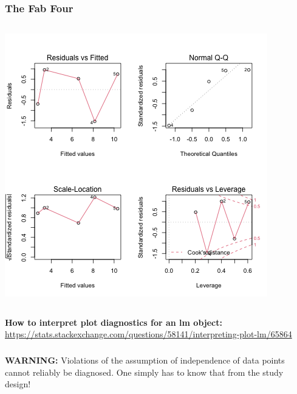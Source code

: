 \documentclass{beamer}
\newenvironment{VerbatimIN}
 {\VerbatimEnvironment
  \begin{tcolorbox}[
    breakable,
    colback=lightgray,
    spartan
  ]%
  \begin{Verbatim}}
 {\end{Verbatim}\end{tcolorbox}}
\begin{document}
\begin{frame}[fragile]
    \frametitle{The Fab Four}
        \begin{columns}
        \begin{column}{0.6\textwidth}
        \includegraphics[width=\textwidth]{lectures/day_2_LM_refresh_I/figures/unnamed-chunk-40-1.png}     
        \end{column}
        \end{columns}
\end{frame}

\begin{frame}
    \large\textbf{How to interpret plot diagnostics for an lm object:}
    \url{https://stats.stackexchange.com/questions/58141/interpreting-plot-lm/65864}
\end{frame}

\begin{frame}
    \frametitle{}
    \textbf{WARNING:} Violations of the assumption of independence of data points cannot reliably be diagnosed. One simply has to know that from the study design!
\end{frame}
\end{document}

